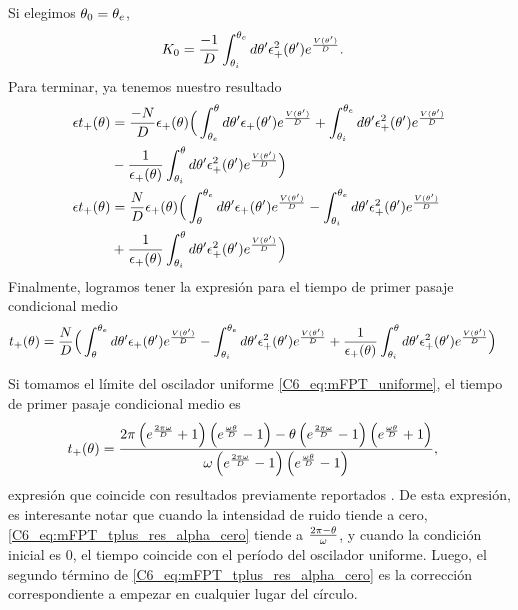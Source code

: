 \documentclass[./main.tex]{subfiles}
\begin{document}
Si elegimos $\theta_0 = \theta_e$,
\begin{align}
   K_0 &= \frac{-1}{D} \int_{\theta_i}^{\theta_e} d\theta'  \epsilon_{+}^2(\theta') e^{ \frac{V(\theta')}{D}}.
\end{align}
Para terminar, ya tenemos nuestro resultado 
\begin{align}
   \epsilon t_+(\theta) &= \frac{-N}{D} \epsilon_{+}(\theta) \Big(  \int_{\theta_e}^\theta d \theta' \epsilon_{+}(\theta') e^{ \frac{V(\theta')}{D}} +  \int_{\theta_i}^{\theta_e} d\theta'  \epsilon_{+}^2(\theta') e^{ \frac{V(\theta')}{D}} \nonumber \\ & - \frac{1}{\epsilon_{+}(\theta)} \int_{\theta_i}^{\theta} d\theta'  \epsilon_{+}^2(\theta') e^{ \frac{V(\theta')}{D}} \Big)\\
     \epsilon t_+(\theta) &= \frac{N}{D} \epsilon_{+}(\theta) \Big(  \int_\theta^{\theta_e} d \theta' \epsilon_{+}(\theta') e^{ \frac{V(\theta')}{D}} -  \int_{\theta_i}^{\theta_e} d\theta'  \epsilon_{+}^2(\theta') e^{ \frac{V(\theta')}{D}} \nonumber \\ & + \frac{1}{\epsilon_{+}(\theta)} \int_{\theta_i}^{\theta} d\theta'  \epsilon_{+}^2(\theta') e^{ \frac{V(\theta')}{D}} \Big)
\end{align}
Finalmente, logramos tener la expresión para el tiempo de primer pasaje condicional medio
\begin{align}
     t_{+}(\theta)&= \frac{N}{D} \Big(  \int_\theta^{\theta_e} d \theta' \epsilon_{+}(\theta') e^{ \frac{V(\theta')}{D}} -  \int_{\theta_i}^{\theta_e} d\theta'  \epsilon_{+}^2(\theta') e^{ \frac{V(\theta')}{D}} + \frac{1}{\epsilon_{+}(\theta)} \int_{\theta_i}^{\theta} d\theta'  \epsilon_{+}^2(\theta') e^{ \frac{V(\theta')}{D}} \Big) \label{C6_eq:mFPT_tplus_res}
\end{align}

Si tomamos el límite del oscilador uniforme \ref{C6_eq:mFPT_uniforme}, el tiempo de primer pasaje condicional medio es 
\begin{align}
     t_{+}(\theta)& = \frac{2 \pi \left(e^{\frac{2 \pi \omega}{D}}+1\right) \left(e^{\frac{\omega \theta}{D}}-1\right)-\theta\left(e^{\frac{2 \pi\omega}{D}}-1\right) \left(e^{\frac{\omega \theta}{D}}+1\right)}{\omega \left(e^{\frac{2 \pi \omega}{D}}-1\right) \left(e^{\frac{\omega \theta}{D}}-1\right)},
     \label{C6_eq:mFPT_tplus_res_alpha_cero} 
\end{align}
expresión que coincide con resultados previamente reportados \cite{Redner2001}. De esta expresión, es interesante notar que cuando la intensidad de ruido tiende a cero, \ref{C6_eq:mFPT_tplus_res_alpha_cero} tiende a $\frac{2\pi - \theta}{\omega}$, y cuando la condición inicial es $0$, el tiempo coincide con el período del oscilador uniforme. Luego, el segundo término de \ref{C6_eq:mFPT_tplus_res_alpha_cero} es la corrección correspondiente a empezar en cualquier lugar \xx del círculo. 
\end{document}
